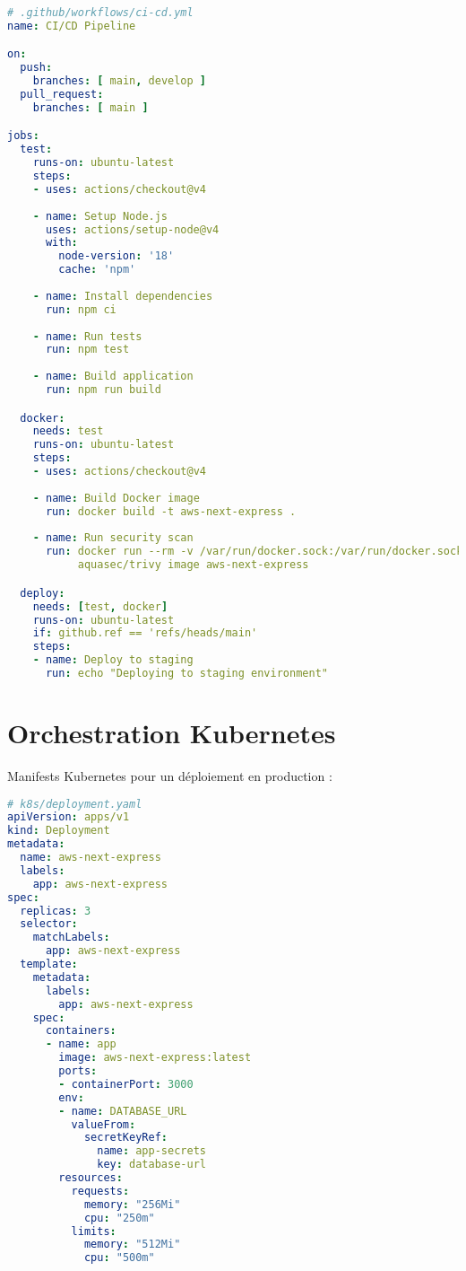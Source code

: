 \documentclass[12pt,a4paper]{report}
\begin{document}
\begin{lstlisting}[language=yaml, caption=Pipeline CI/CD avec GitHub Actions]
# .github/workflows/ci-cd.yml
name: CI/CD Pipeline

on:
  push:
    branches: [ main, develop ]
  pull_request:
    branches: [ main ]

jobs:
  test:
    runs-on: ubuntu-latest
    steps:
    - uses: actions/checkout@v4
    
    - name: Setup Node.js
      uses: actions/setup-node@v4
      with:
        node-version: '18'
        cache: 'npm'
    
    - name: Install dependencies
      run: npm ci
    
    - name: Run tests
      run: npm test
    
    - name: Build application
      run: npm run build

  docker:
    needs: test
    runs-on: ubuntu-latest
    steps:
    - uses: actions/checkout@v4
    
    - name: Build Docker image
      run: docker build -t aws-next-express .
    
    - name: Run security scan
      run: docker run --rm -v /var/run/docker.sock:/var/run/docker.sock 
           aquasec/trivy image aws-next-express

  deploy:
    needs: [test, docker]
    runs-on: ubuntu-latest
    if: github.ref == 'refs/heads/main'
    steps:
    - name: Deploy to staging
      run: echo "Deploying to staging environment"
\end{lstlisting}

\section{Orchestration Kubernetes}

Manifests Kubernetes pour un déploiement en production :

\begin{lstlisting}[language=yaml, caption=Déploiement Kubernetes]
# k8s/deployment.yaml
apiVersion: apps/v1
kind: Deployment
metadata:
  name: aws-next-express
  labels:
    app: aws-next-express
spec:
  replicas: 3
  selector:
    matchLabels:
      app: aws-next-express
  template:
    metadata:
      labels:
        app: aws-next-express
    spec:
      containers:
      - name: app
        image: aws-next-express:latest
        ports:
        - containerPort: 3000
        env:
        - name: DATABASE_URL
          valueFrom:
            secretKeyRef:
              name: app-secrets
              key: database-url
        resources:
          requests:
            memory: "256Mi"
            cpu: "250m"
          limits:
            memory: "512Mi"
            cpu: "500m"
\end{lstlisting}
\end{document}
